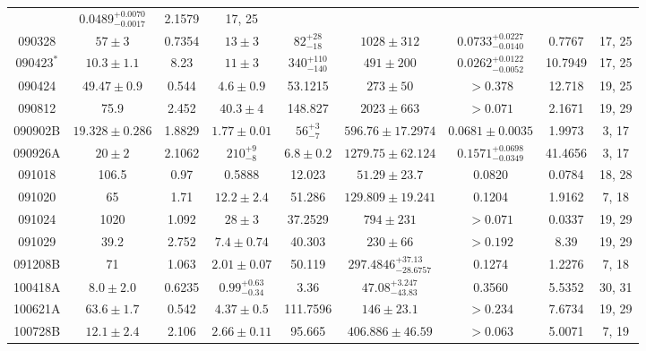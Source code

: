 \documentclass[a4paper,fleqn,usenatbib]{mnras}
\begin{document}
\begin{table*}
\begin{tabular}[width=1.0 \linewidth]{ccccccccc}
&	$0.0489_{-0.0017}^{+0.0070}$ &	2.1579 &	17, 25 \\																																																																					090328 &	$57\pm 3$ &	0.7354 &	$13 \pm 3$ &	$82_{-18}^{+28}$ & $1028 \pm 312$ &	$0.0733_{-0.0140}^{+ 0.0227}$ &	0.7767 &	17, 25 \\																																																																					$090423^{*}$ &	$10.3\pm 1.1$ &	8.23  &$11 \pm 3$ &	$340_{-140}^{+110}$ &$491 \pm 200$ &	$0.0262_{-0.0052}^{+0.0122}$ &	10.7949 &	17, 25 \\																																																																					090424 &	$49.47 \pm 0.9$ &	0.544 &	$4.6 \pm 0.9$ &	53.1215 &	$273 \pm 50$ &	$>0.378$ &	12.718 &	19, 25 \\																																																																					090812 &	75.9 &	2.452 &	$40.3 \pm 4$ &	148.827 &	$2023 \pm 663$ &	$>0.071$ &	2.1671 &	19, 29 \\																																																																					090902B & $19.328 \pm 0.286$ &	1.8829  &	$1.77\pm0.01$ &	$56_{-7}^{+3}$ &$596.76\pm17.2974$ &	$0.0681\pm0.0035$ &	1.9973 &	3, 17 \\																																																																					090926A &	$20\pm 2$ &	2.1062 &	$210_{-8}^{+9}$ &	$6.8 \pm 0.2$ &	$1279.75\pm62.124$ &	$0.1571_{-0.0349}^{+0.0698}$ &	41.4656 &	3, 17 \\																																																																					091018 &	106.5 &	0.97 &	 0.5888 &	    12.023 &	$51.29\pm23.7$ &	0.0820 &	0.0784 &	18, 28  \\																																																																					091020 &	65 &	1.71 &	$12.2 \pm 2.4$ &	    51.286 &	$129.809 \pm 19.241$ &	0.1204 &	1.9162 &	7, 18 \\																																																																					091024 &	1020 &	1.092 &	$28 \pm 3$ &	37.2529 &	$794 \pm 231$ &	$>0.071$ &	0.0337 &	19, 29 \\																																																																					091029 &	39.2 &	2.752 &	$7.4 \pm 0.74$ &	40.303 &	$230 \pm 66$ &	$>0.192$ &	8.39 &	19, 29 \\																																																																					091208B &	71 &	1.063 &	$2.01 \pm 0.07$ &	    50.119 &	$297.4846_{-28.6757}^{+37.13}$ &	0.1274 &	1.2276 &	7, 18 \\																																																																					100418A &	$8.0 \pm 2.0$ &	0.6235 &	$0.99_{-0.34}^{+0.63}$ &	3.36 &	$47.08_{-43.83}^{+3.247} $ &	0.3560 &	5.5352 &	30, 31 \\																																																																					100621A &	$63.6 \pm 1.7$ &	0.542 &	$4.37 \pm 0.5$ &	111.7596 &	$146 \pm 23.1$ &	$>0.234$ &	7.6734 &	19, 29 \\																																																																					100728B &	$12.1 \pm 2.4$ &	2.106 &	$2.66 \pm 0.11$ &	95.665 &	$406.886 \pm 46.59$ &	$>0.063$ &	5.0071 &	7, 19 
\end{tabular}
\end{table*}
\end{document}
